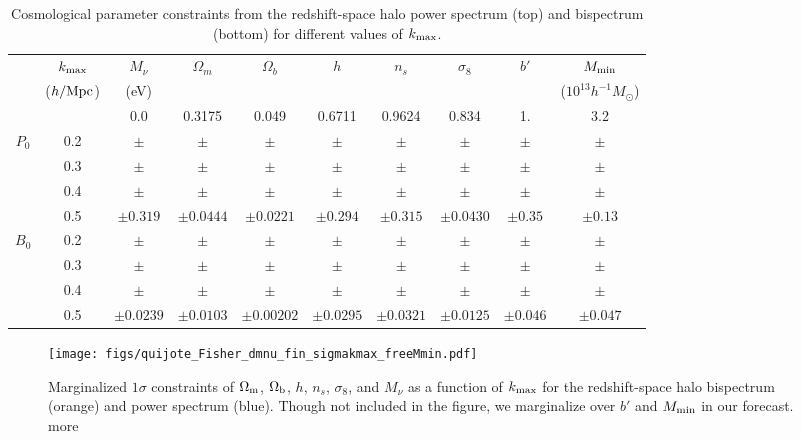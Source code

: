 \documentclass[12pt, letterpaper, preprint]{aastex62}
\newcommand{\Om}{\Omega_{\rm m}}
\newcommand{\Ob}{\Omega_{\rm b}}
\newcommand{\smnu}{M_\nu}
\newcommand{\sig}{\sigma_8}
\newcommand{\ch}[1]{{\color{orange}{\bf CH:} #1}}
\begin{document}
\begin{table}
    \caption{Cosmological parameter constraints from the redshift-space halo power spectrum (top) and bispectrum (bottom) 
    for different values of $k_{\rm max}$.} 
\begin{center} 
    \begin{tabular}{cccccccccc} \toprule
         & $k_{\rm max}$ & $\smnu$ & $\Omega_m$ & $\Omega_b$ & $h$ & $n_s$ & $\sig$ & $b'$ & $M_{\rm min}$ \\
         & ({\footnotesize $h/{\rm Mpc}$}) &({\footnotesize eV}) & & & & & & & ({\footnotesize $10^{13} h^{-1}M_\odot$}) \\[3pt] \hline\hline

                    &     & 0.0 & 0.3175 & 0.049 & 0.6711 & 0.9624 & 0.834 & 1. & 3.2  \\ 
        $P_0$    & 0.2 & $\pm$ & $\pm$ & $\pm$ & $\pm$ & $\pm$ & $\pm$ & $\pm$ & $\pm$ \\ 
                    & 0.3 & $\pm$ & $\pm$ & $\pm$ & $\pm$ & $\pm$ & $\pm$ & $\pm$ & $\pm$ \\ 
                    & 0.4 & $\pm$ & $\pm$ & $\pm$ & $\pm$ & $\pm$ & $\pm$ & $\pm$ & $\pm$ \\ 
                    & 0.5 & $\pm0.319$ & $\pm 0.0444$ & $\pm 0.0221$ & $\pm0.294$ & $\pm0.315$ & $\pm0.0430$ & $\pm0.35$ & $\pm0.13$  \\ \hline
        $B_0$  & 0.2 & $\pm$ & $\pm$ & $\pm$ & $\pm$ & $\pm$ & $\pm$ & $\pm$ & $\pm$ \\ 
                            & 0.3 & $\pm$ & $\pm$ & $\pm$ & $\pm$ & $\pm$ & $\pm$ & $\pm$ & $\pm$ \\ 
                            & 0.4 & $\pm$ & $\pm$ & $\pm$ & $\pm$ & $\pm$ & $\pm$ & $\pm$ & $\pm$ \\ 
                            & 0.5 & $\pm0.0239$ & $\pm0.0103$ & $\pm0.00202$ & $\pm0.0295$ & $\pm0.0321$ & $\pm0.0125$ & $\pm0.046$ & $\pm0.047$ \\[3pt]
    \hline
\end{tabular} \label{tab:forecast}
\end{center}
\end{table}

\begin{figure}
\begin{center}
    \texttt{[image: figs/quijote\_Fisher\_dmnu\_fin\_sigmakmax\_freeMmin.pdf]} 
    \caption{Marginalized $1\sigma$ constraints of $\Om$, $\Ob$, $h$, $n_s$, $\sig$, and $\smnu$ 
    as a function of $k_{\rm max}$ for the redshift-space halo bispectrum (orange) and power 
    spectrum (blue). Though not included in the figure, we marginalize over $b'$ and $M_{\rm min}$
    in our forecast.\ch{more}}
\label{fig:fish_kmax}
\end{center}
\end{figure}
\end{document}
